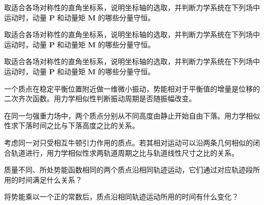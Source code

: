 \newpage
\noindent\begin{minipage}{\textwidth}
取适合各场对称性的直角坐标系，说明坐标轴的选取，并判断力学系统在下列场中运动时，动量 $\mathbf P$ 和动量矩 $\mathbf M$ 的哪些分量守恒。
\end{minipage}\par\vfill
\noindent\begin{minipage}{\textwidth}
取适合各场对称性的直角坐标系，说明坐标轴的选取，并判断力学系统在下列场中运动时，动量 $\mathbf P$ 和动量矩 $\mathbf M$ 的哪些分量守恒。
\end{minipage}\par\vfill
\newpage
\noindent\begin{minipage}{\textwidth}
取适合各场对称性的直角坐标系，说明坐标轴的选取，并判断力学系统在下列场中运动时，动量 $\mathbf P$ 和动量矩 $\mathbf M$ 的哪些分量守恒。
\end{minipage}\par\vfill
\noindent\begin{minipage}{\textwidth}
一个质点在稳定平衡位置附近做一维微小振动，势能相对于平衡值的增量是位移的二次齐次函数。用力学相似性判断振动周期是否随振幅改变。
\end{minipage}\par\vfill
\newpage
\noindent\begin{minipage}{\textwidth}
在同一匀强重力场中，两个质点分别从不同高度由静止开始自由下落。用力学相似性求下落时间之比与下落高度之比的关系。
\end{minipage}\par\vfill
\noindent\begin{minipage}{\textwidth}
考虑同一对只受相互牛顿引力作用的质点。若其相对运动可以沿两条几何相似的闭合轨道进行，用力学相似性求两轨道周期之比与轨道线性尺寸之比的关系。
\end{minipage}\par\vfill
\newpage
\noindent\begin{minipage}{\textwidth}
质量不同、所处势能函数相同的两个质点沿相同轨迹运动，它们通过对应轨迹段所用的时间满足什么关系？
\end{minipage}\par\vfill
\noindent\begin{minipage}{\textwidth}
将势能乘以一个正的常数后，质点沿相同轨迹运动所用的时间有什么变化？
\end{minipage}\par\vfill
